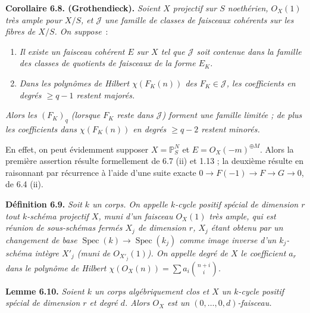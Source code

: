 
\textbf{Corollaire 6.8. (Grothendieck).} \emph{Soient $X$ projectif sur $S$ noeth\'erien, ${O}_X(1)$ tr\`es ample pour $X/S$, et $\mathcal J$ une famille de classes de faisceaux coh\'erents sur les fibres de $X/S$. On suppose}~:
\begin{enumerate}[label=(\alph*)]
\item \emph{Il existe un faisceau coh\'erent $E$ sur $X$ tel que $\mathcal J$ soit contenue dans la famille des classes de quotients de faisceaux de la forme $E_K$.}
\item[$(b_q)$] \emph{Dans les polyn\^omes de Hilbert $\chi(F_K(n))$ des $F_K\in\mathcal J$, les coefficients en degr\'es $\ge q-1$ restent major\'es.}
\end{enumerate}
\emph{Alors les $(F_K)_q$ (lorsque $F_K$ reste dans $\mathcal J$) forment une famille limit\'ee ; de plus les coefficients dans $\chi(F_K(n))$ en degr\'es $\ge q-2$ restent minor\'es.}

En effet, on peut \'evidemment supposer $X=\mathbb P^N_S$ et $E={O}_X(-m)^{\oplus M}$. Alors la premi\`ere assertion r\'esulte formellement de 6.7 (ii) et 1.13 ; la deuxi\`eme r\'esulte en raisonnant par r\'ecurrence \`a l'aide d'une suite exacte $0\to F(-1)\to F\to G\to0$, de 6.4 (ii).

\textbf{D\'efinition 6.9.} \emph{Soit $k$ un corps. On appelle \emph{$k$-cycle positif sp\'ecial de dimension $r$} tout $k$-sch\'ema projectif $X$, muni d'un faisceau ${O}_X(1)$ tr\`es ample, qui est r\'eunion de sous-sch\'emas ferm\'es $X_j$ de dimension $r$, $X_j$ \'etant obtenu par un changement de base $\operatorname{Spec}(k)\to\operatorname{Spec}(k_j)$ comme image inverse d'un $k_j$-sch\'ema \emph{int\`egre} $X'_j$ (muni de ${O}_{X'_j}(1)$). On appelle \emph{degr\'e} de $X$ le coefficient $a_r$ dans le polyn\^ome de Hilbert $\chi({O}_X(n))=\sum a_i\binom{n+i}{i}$.}

\textbf{Lemme 6.10.} \emph{Soient $k$ un corps alg\'ebriquement clos et $X$ un $k$-cycle positif sp\'ecial de dimension $r$ et degr\'e $d$. Alors ${O}_X$ est un $(0,\ldots,0,d)$-faisceau.}

